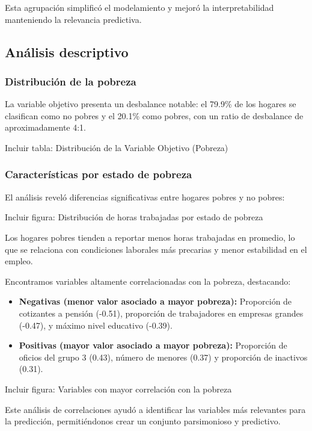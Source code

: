 \documentclass[12pt,a4paper,onecolumn]{article}
\begin{document}
Esta agrupación simplificó el modelamiento y mejoró la interpretabilidad manteniendo la relevancia predictiva.

\subsection{Análisis descriptivo}

\subsubsection{Distribución de la pobreza}

La variable objetivo presenta un desbalance notable: el 79.9\% de los hogares se clasifican como no pobres y el 20.1\% como pobres, con un ratio de desbalance de aproximadamente 4:1.

{\color{blue} Incluir tabla: Distribución de la Variable Objetivo (Pobreza)}

\subsubsection{Características por estado de pobreza}

El análisis reveló diferencias significativas entre hogares pobres y no pobres:

{\color{blue} Incluir figura: Distribución de horas trabajadas por estado de pobreza}

Los hogares pobres tienden a reportar menos horas trabajadas en promedio, lo que se relaciona con condiciones laborales más precarias y menor estabilidad en el empleo.

Encontramos variables altamente correlacionadas con la pobreza, destacando:
\begin{itemize}
    \item \textbf{Negativas (menor valor asociado a mayor pobreza):} Proporción de cotizantes a pensión (-0.51), proporción de trabajadores en empresas grandes (-0.47), y máximo nivel educativo (-0.39).
    \item \textbf{Positivas (mayor valor asociado a mayor pobreza):} Proporción de oficios del grupo 3 (0.43), número de menores (0.37) y proporción de inactivos (0.31).
\end{itemize}

{\color{blue} Incluir figura: Variables con mayor correlación con la pobreza}

Este análisis de correlaciones ayudó a identificar las variables más relevantes para la predicción, permitiéndonos crear un conjunto parsimonioso y predictivo.
\end{document}
